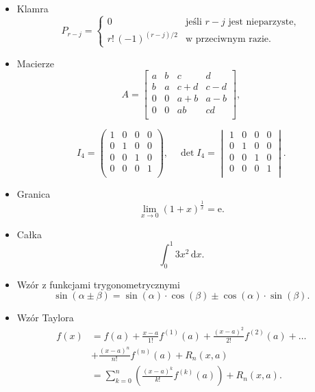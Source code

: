 \begin{itemize}
\item Klamra
\begin{equation}
P_{r-j}=\begin{cases}
	0							& \text{jeśli $r-j$ jest nieparzyste},\\
	r!\,(-1)^{(r-j)/2}	& \text{w przeciwnym razie}.
\end{cases}
\end{equation}

\item Macierze
\begin{equation}
A=
	\begin{bmatrix}
		a	&	b	&	c		&	d	\\
		b	&	a	&	c+d	&	c-d	\\
		0	&	0	&	a+b	&	a-b	\\
		0	&	0	&	ab		&	cd	\\
	\end{bmatrix},
\end{equation}

\begin{equation}I_4=
	\begin{pmatrix}
			1 & 0 & 0 & 0 \\
		 	0 & 1 & 0 & 0 \\
			0 & 0 & 1 & 0 \\
			0 & 0 & 0 & 1 \\ 
	\end{pmatrix}
,\quad
\det{I_4}=
	\begin{vmatrix}
			1 & 0 & 0 & 0 \\
		 	0 & 1 & 0 & 0 \\
			0 & 0 & 1 & 0 \\
			0 & 0 & 0 & 1 \\ 
	\end{vmatrix}.
\end{equation}

\item Granica
\begin{equation}
\lim_{x\to 0}(1+x)^{\frac{1}{x}}=\mathrm{e}.
\end{equation}
\item Całka
\begin{equation}
\int_{0}^{1}3x^2\,\mathrm{d}x.
\end{equation}
\item Wzór z funkcjami trygonometrycznymi
\begin{equation}
\sin (\alpha \pm \beta) = \sin (\alpha) \cdot \cos (\beta) \pm \cos (\alpha) \cdot \sin (\beta).
\end{equation} 

\item Wzór Taylora
\begin{equation}
	\begin{split}f(x) &= f(a) + \frac{x-a}{1!} f^{(1)}(a) + \frac{(x-a)^2}{2!} f^{(2)}(a) + \ldots \\
							&+ \frac{(x-a)^n}{n!} f^{(n)}(a) + R_n(x,a)\\
							&= \sum\limits_{k=0}^n \left( \frac{(x-a)^k}{k!} f^{(k)}(a) \right) + R_n(x,a).
	\end{split}
\end{equation}
\end{itemize}